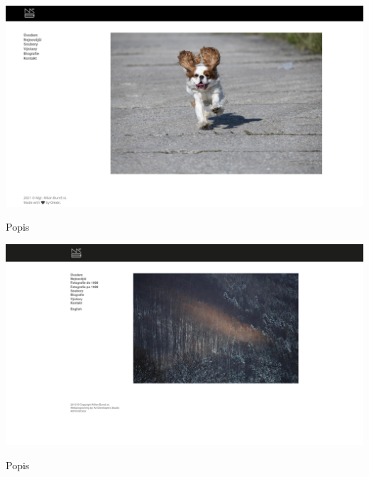 \documentclass[12pt,a4paper]{report}
\begin{document}
  \vspace*{0.5cm}
  \noindent\includegraphics[width=\linewidth]{dmp-bures.png}
  \begin{center}
    Popis
  \end{center}
  \vspace*{0.5cm}
  \noindent\includegraphics[width=\linewidth]{milanburescz.png}
  \begin{center}
    Popis
  \end{center}
  \vspace*{0.5cm}
\end{document}
